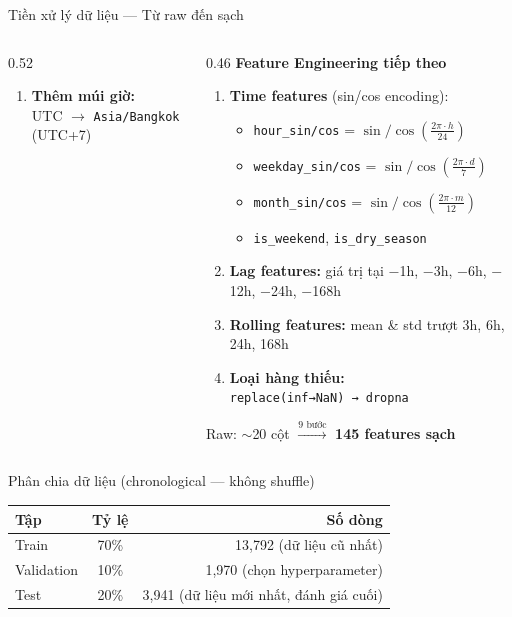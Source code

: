 \documentclass[aspectratio=169]{beamer}
\begin{document}
\begin{frame}{Tiền xử lý dữ liệu --- Từ raw đến sạch}
\begin{columns}[T]
\begin{column}{0.52\textwidth}
\begin{enumerate}
        \item \textbf{Thêm múi giờ:}\\
              UTC $\to$ \texttt{Asia/Bangkok} (UTC+7)
      \end{enumerate}
    \end{column}
    \begin{column}{0.46\textwidth}
      \textbf{Feature Engineering tiếp theo}
      \begin{enumerate}\small
        \setcounter{enumi}{5}
        \item \textbf{Time features} (sin/cos encoding):
          \begin{itemize}\small
            \item \texttt{hour\_sin/cos} = $\sin/\cos\!\left(\frac{2\pi \cdot h}{24}\right)$
            \item \texttt{weekday\_sin/cos} = $\sin/\cos\!\left(\frac{2\pi \cdot d}{7}\right)$
            \item \texttt{month\_sin/cos} = $\sin/\cos\!\left(\frac{2\pi \cdot m}{12}\right)$
            \item \texttt{is\_weekend}, \texttt{is\_dry\_season}
          \end{itemize}

        \item \textbf{Lag features:} giá trị tại $-$1h, $-$3h, $-$6h, $-$12h, $-$24h, $-$168h

        \item \textbf{Rolling features:} mean \& std trượt 3h, 6h, 24h, 168h

        \item \textbf{Loại hàng thiếu:}\\
              \texttt{replace(inf→NaN) → dropna}
      \end{enumerate}
      \vspace{0.3em}
      \begin{alertblock}{}
        \centering
        Raw: $\sim$20 cột $\xrightarrow{\text{9 bước}}$ \textbf{145 features sạch}
      \end{alertblock}
    \end{column}
  \end{columns}

  \begin{block}{Phân chia dữ liệu (chronological --- không shuffle)}
    \centering\small
    \begin{tabular}{lcr}
      \toprule
      \textbf{Tập} & \textbf{Tỷ lệ} & \textbf{Số dòng} \\
      \midrule
      Train & 70\% & 13,792 \quad (dữ liệu cũ nhất) \\
      Validation & 10\% & 1,970 \quad (chọn hyperparameter) \\
      Test & 20\% & 3,941 \quad (dữ liệu mới nhất, đánh giá cuối) \\
      \bottomrule
    \end{tabular}
  \end{block}
\end{frame}
\end{document}
